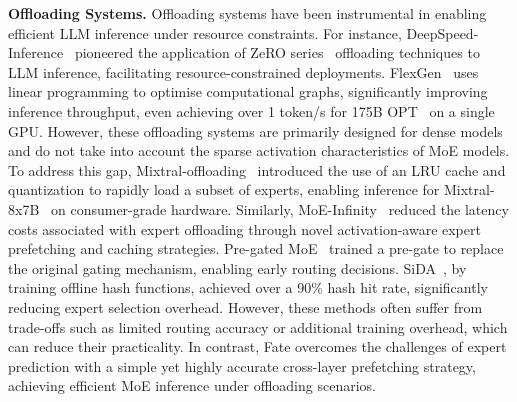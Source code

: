 \textbf{Offloading Systems.} Offloading systems have been instrumental in enabling efficient LLM inference under resource constraints. For instance, DeepSpeed-Inference~\cite{aminabadi2022deepspeed} pioneered the application of ZeRO series~\cite{ren2021zero, rajbhandari2021zero} offloading techniques to LLM inference, facilitating resource-constrained deployments. FlexGen~\cite{sheng2023flexgen} uses linear programming to optimise computational graphs, significantly improving inference throughput, even achieving over 1 token/s for 175B OPT~\cite{zhang2022opt} on a single GPU. However, these offloading systems are primarily designed for dense models and do not take into account the sparse activation characteristics of MoE models.
To address this gap, Mixtral-offloading~\cite{eliseev2023fast} introduced the use of an LRU cache and quantization to rapidly load a subset of experts, enabling inference for Mixtral-8x7B~\cite{jiang2024mixtral} on consumer-grade hardware. Similarly, MoE-Infinity~\cite{xue2024moe} reduced the latency costs associated with expert offloading through novel activation-aware expert prefetching and caching strategies. Pre-gated MoE~\cite{hwang2024pre} trained a pre-gate to replace the original gating mechanism, enabling early routing decisions. SiDA~\cite{du2024sida}, by training offline hash functions, achieved over a 90\% hash hit rate, significantly reducing expert selection overhead.
However, these methods often suffer from trade-offs such as limited routing accuracy or additional training overhead, which can reduce their practicality. In contrast, Fate overcomes the challenges of expert prediction with a simple yet highly accurate cross-layer prefetching strategy, achieving efficient MoE inference under offloading scenarios.